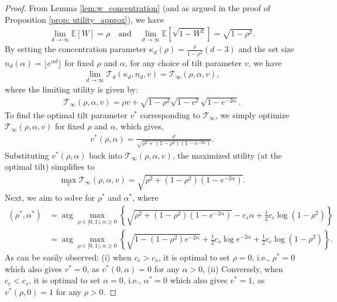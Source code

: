 \documentclass[12pt]{article}
\theoremstyle{definition}
\theoremstyle{remark}
\begin{document}
\begin{proof}
From Lemma \ref{lem:w_concentration} (and as argued in the proof of Proposition \ref{prop: utility_approx}), we have
\begin{align*}
\lim_{d\rightarrow \infty} \mathbb{E}[W] = \rho \quad \text{and} \quad \lim_{d\rightarrow \infty} \mathbb{E}[\sqrt{1-W^2}] = \sqrt{1-\rho^2}.
\end{align*}
By setting the concentration parameter $\kappa_d(\rho) = \frac{\rho}{1-\rho^2}(d-3)$ and the set size $n_d(\alpha) = \lfloor e^{\alpha d} \rfloor$ for fixed $\rho$ and $\alpha$, for any choice of tilt parameter $v$, we have
\begin{align*}
\lim_{d \to \infty} \mathcal{T}_d(\kappa_d, n_d, v) =\mathcal{T}_{\infty}(\rho, \alpha, v),
\end{align*}
where the limiting utility is given by:
\begin{align*}
\mathcal{T}_{\infty}(\rho, \alpha, v) = \rho v + \sqrt{1-\rho^2}\sqrt{1-v^2}\sqrt{1-e^{-2\alpha}}.
\end{align*}
To find the optimal tilt parameter $v^*$ corresponding to $\mathcal{T}_{\infty}$, we simply optimize $\mathcal{T}_{\infty}(\rho, \alpha, v)$ for fixed $\rho$ and $\alpha$, which gives,
\begin{align*}
    v^*(\rho, \alpha) = \frac{\rho}{\sqrt{\rho^2 + (1-\rho^2)(1-e^{-2\alpha})}}.
\end{align*}
Substituting $v^*(\rho, \alpha)$ back into $\mathcal{T}_{\infty}(\rho, \alpha, v)$, the maximized utility (at the optimal tilt) simplifies to
\begin{align*}
\max_v \mathcal{T}_{\infty}(\rho, \alpha, v) = \sqrt{\rho^2 + (1-\rho^2)(1-e^{-2\alpha})}.
\end{align*}
Next, we aim to solve for $\rho^*$ and $\alpha^*$, where
\begin{align*}
   (\rho^*, \alpha^*) &= \arg \max_{\rho \in [0,1), \alpha \geq 0} \left\{ \sqrt{\rho^2 + (1-\rho^2)(1-e^{-2\alpha})} - c_s \alpha + \frac{1}{2} c_c \log(1-\rho^2) \right\}\\
   &= \arg \max_{\rho \in [0,1), \alpha \geq 0} \left\{ \sqrt{1-(1-\rho^2)e^{-2\alpha}} + \frac{1}{2}  c_s\log e^{-2\alpha} + \frac{1}{2} c_c \log(1-\rho^2) \right\}.
\end{align*}
As can be easily observed: (i) when $c_c > c_s$, it is optimal to set $\rho=0$, i.e., $\rho^* = 0$ which also gives $v^* = 0$, as $v^*(0,\alpha)=0$ for any $\alpha > 0$, (ii) Conversely, when $c_c < c_s$, it is optimal to set $\alpha=0$, i.e., $\alpha^* = 0$ which also gives $v^* = 1$, as $v^*(\rho,0)=1$ for any $\rho > 0$.


\end{proof}
\end{document}
